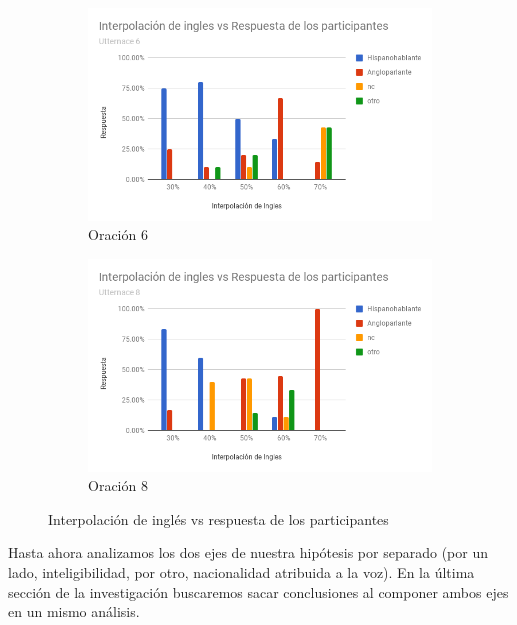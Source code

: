 \begin{figure}
\centering
\begin{subfigure}{.5\textwidth}
  \centering
	\includegraphics[trim={0 0 0 2.5cm},clip,width=1\textwidth]{imagenes/nacionalidades/6.png}
  \caption{Oración 6}
\end{subfigure}%
\begin{subfigure}{.5\textwidth}
  \centering
	\includegraphics[trim={0 0 0 2.5cm},clip,width=1\textwidth]{imagenes/nacionalidades/8.png}
  \caption{Oración 8}
\end{subfigure}
\caption{Interpolación de inglés vs respuesta de los participantes}
\label{sieteOcho}
\end{figure}

Hasta ahora analizamos los dos ejes de nuestra hipótesis por separado (por un lado, inteligibilidad, por otro, nacionalidad atribuida a la voz). En la última sección de la investigación buscaremos sacar conclusiones al componer ambos ejes en un mismo análisis.

